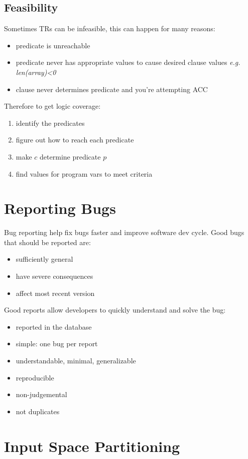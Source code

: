 \documentclass[]{article}
\theoremstyle{definition}
\begin{document}
		\subsection{Feasibility}
		Sometimes TRs can be infeasible, this can happen for many reasons:
		\begin{itemize}
			\item predicate is unreachable
			\item predicate never has appropriate values to cause desired clause values \textit{e.g. len(array)<0} 
			\item clause never determines predicate and you're attempting ACC
		\end{itemize}
		Therefore to get logic coverage:
		\begin{enumerate}
			\item identify the predicates 
			\item figure out how to reach each predicate
			\item make $c$ determine predicate $p$
			\item find values for program vars to meet criteria
		\end{enumerate}

		\section{Reporting Bugs}
		Bug reporting help fix bugs faster and improve software dev cycle. Good bugs that should be reported are:
		\begin{itemize}
			\item sufficiently general
			\item have severe consequences
			\item affect most recent version
		\end{itemize}
		Good reports allow developers to quickly understand and solve the bug:
		\begin{itemize}
			\item reported in the database
			\item simple: one bug per report
			\item understandable, minimal, generalizable
			\item reproducible
			\item non-judgemental
			\item not duplicates
		\end{itemize}

		\section{Input Space Partitioning}
\end{document}
